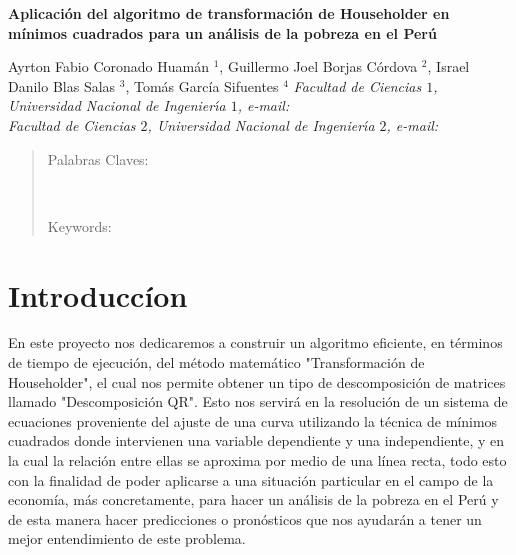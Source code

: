 \documentclass[twocolumn,twoside]{article}
\begin{document}
\begin{center}
 {\Large \textbf{Aplicaci\'on del algoritmo de transformaci\'on de Householder en m\'inimos cuadrados para un an\'alisis 
 de la pobreza en el Per\'u}}
\end{center}
\begin{center}
 Ayrton Fabio Coronado Huam\'an $^1$, Guillermo Joel Borjas C\'ordova $^2$,
 Israel Danilo Blas Salas $^3$, Tom\'as Garc\'ia Sifuentes $^4$ \vskip12pt
{\it Facultad de Ciencias $1$, Universidad Nacional de Ingenier\'{\i}a $1$, e-mail: \\
Facultad de Ciencias $2$, Universidad Nacional de Ingenier\'{\i}a $2$, e-mail:  }
\end{center}
\begin{quotation}
{\small

Palabras Claves:  
}\\
{\small
\hspace*{0.5cm} 

Keywords: \\ 
}
\end{quotation}

\section{Introducc\'ion}

En este proyecto nos dedicaremos a construir un algoritmo eficiente, en t\'erminos de
tiempo de ejecuci\'on, del m\'etodo matem\'atico "Transformaci\'on de Householder", el cual
nos permite obtener un tipo de descomposici\'on de matrices llamado "Descomposici\'on QR".
Esto nos servir\'a en la resoluci\'on de un sistema de ecuaciones proveniente del ajuste de
una curva utilizando la t\'ecnica de m\'inimos cuadrados donde intervienen una variable 
dependiente y una independiente, y en la cual la relaci\'on entre ellas se aproxima por medio
de una l\'inea recta, todo esto con la finalidad de poder aplicarse a una situaci\'on 
particular en el campo de la economía, m\'as concretamente, para hacer un an\'alisis de la 
pobreza en el Per\'u y de esta manera hacer predicciones o pron\'osticos que nos ayudar\'an a 
tener un mejor entendimiento de este problema.\\
\end{document}
